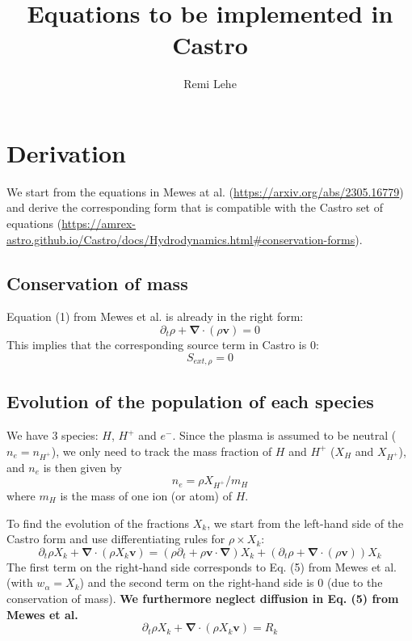 \documentclass[11pt, oneside]{article}   	%
\title{Equations to be implemented in Castro}
\author{Remi Lehe}
\begin{document}
\maketitle

\section{Derivation}

We start from the equations in Mewes at al. (\url{https://arxiv.org/abs/2305.16779}) and derive the corresponding form that is compatible with the Castro set of equations (\url{https://amrex-astro.github.io/Castro/docs/Hydrodynamics.html#conservation-forms}).

\subsection{Conservation of mass}

Equation (1) from Mewes et al. is already in the right form:
\[ \partial_t \rho + \boldsymbol{\nabla}\cdot( \rho\boldsymbol{v} ) = 0  \]
This implies that the corresponding source term in Castro is 0:
\[ S_{ext,\rho} = 0 \] 

\subsection{Evolution of the population of each species}

We have 3 species: $H$, $H^+$ and $e^{-}$. Since the plasma is assumed to be neutral ($n_e = n_{H^+}$), we only need to track the mass fraction of $H$ and $H^+$ ($X_H$ and $X_{H^+}$), and $n_e$ is then given by
\[ n_e = \rho X_{H^+} / m_H \]
where $m_H$ is the mass of one ion (or atom) of $H$.

To find the evolution of the fractions $X_k$, we start from the left-hand side of the Castro form and use differentiating rules for $\rho \times X_k$:
\[ \partial_t \rho X_k + \boldsymbol{\nabla}\cdot( \rho X_k \boldsymbol{v} ) =  (\rho\partial_t + \rho \boldsymbol{v}\cdot\boldsymbol{\nabla})X_k + (\partial_t \rho + \boldsymbol{\nabla}\cdot(\rho \boldsymbol{v} ) ) X_k\]
The first term on the right-hand side corresponds to Eq. (5) from Mewes et al. (with $w_\alpha = X_k$) and the second term on the right-hand side is 0 (due to the conservation of mass). \textbf{We furthermore neglect diffusion in Eq. (5) from Mewes et al.}
\[ \partial_t \rho X_k + \boldsymbol{\nabla}\cdot( \rho X_k \boldsymbol{v} ) = R_k \]
\end{document}
